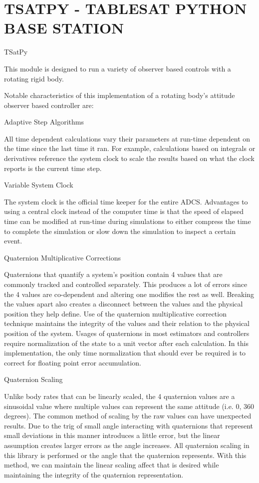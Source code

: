
\chapter{TSATPY - TABLESAT PYTHON BASE STATION}
\label{chap:TSatPy}

TSatPy

This module is designed to run a variety of observer based controls with a rotating rigid body.

Notable characteristics of this implementation of a rotating body's attitude observer based controller are:

Adaptive Step Algorithms

All time dependent calculations vary their parameters at run-time dependent on the time since the last time it ran. For example, calculations based on integrals or derivatives reference the system clock to scale the results based on what the clock reports is the current time step.

Variable System Clock

The system clock is the official time keeper for the entire ADCS. Advantages to using a central clock instead of the computer time is that the speed of elapsed time can be modified at run-time during simulations to either compress the time to complete the simulation or slow down the simulation to inspect a certain event.

Quaternion Multiplicative Corrections

Quaternions that quantify a system's position contain 4 values that are commonly tracked and controlled separately. This produces a lot of errors since the 4 values are co-dependent and altering one modifies the rest as well. Breaking the values apart also creates a disconnect between the values and the physical position they help define. Use of the quaternion multiplicative correction technique maintains the integrity of the values and their relation to the physical position of the system. Usages of quaternions in most estimators and controllers require normalization of the state to a unit vector after each calculation. In this implementation, the only time normalization that should ever be required is to correct for floating point error accumulation.

Quaternion Scaling

Unlike body rates that can be linearly scaled, the 4 quaternion values are a sinusoidal value where multiple values can represent the same attitude (i.e. 0, 360 degrees). The common method of scaling by the raw values can have unexpected results. Due to the trig of small angle interacting with quaternions that represent small deviations in this manner introduces a little error, but the linear assumption creates larger errors as the angle increases. All quaternion scaling in this library is performed or the angle that the quaternion represents. With this method, we can maintain the linear scaling affect that is desired while maintaining the integrity of the quaternion representation.

